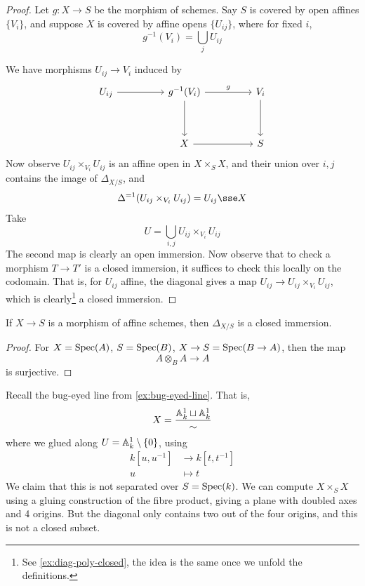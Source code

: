 \documentclass{article}
\begin{document}
\begin{proof}
    Let \(g : X \to S\) be the morphism of schemes. Say \(S\) is covered by open affines \(\{V_i\}\), and suppose \(X\) is covered by affine opens \(\{U_{ij}\}\), where for fixed \(i\),
    \[g^{-1}(V_i) = \bigcup_j U_{ij}\]

    We have morphisms \(U_{ij} \to V_i\) induced by
\[\begin{tikzcd}
	{U_{ij}} && {g^{-1}(V_i)} && {V_i} \\
	\\
	&& X && S
	\arrow["g", from=1-3, to=1-5]
	\arrow[from=1-3, to=3-3]
	\arrow[from=1-5, to=3-5]
	\arrow[from=3-3, to=3-5]
	\arrow[from=1-1, to=1-3]
\end{tikzcd}\]
    Now observe \(U_{ij} \times_{V_i} U_{ij}\) is an affine open in \(X \times_S X\), and their union over \(i, j\) contains the image of \(\Delta_{X/S}\), and
    \[\Delta^{=1}(U_{ij} \times_{V_i} U_{ij}) = U_{ij} \sse X\] 
    Take
    \[U = \bigcup_{i, j}U_{ij} \times_{V_i}U_{ij}\]
    The second map is clearly an open immersion. Now observe that to check a morphism \(T \to T'\) is a closed immersion, it suffices to check this locally on the codomain. That is, for \(U_{ij}\) affine, the diagonal gives a map \(U_{ij} \to U_{ij} \times_{V_i}U_{ij}\), which is clearly\footnote{See \cref{ex:diag-poly-closed}, the idea is the same once we unfold the definitions.} a closed immersion.
\end{proof}

\begin{proposition}
    \label{prop:aff-morphism-separated}
    If \(X \to S\) is a morphism of affine schemes, then \(\Delta_{X/S}\) is a closed immersion.
\end{proposition}

\begin{proof}
    For \(X = \operatorname{Spec}(A)\), \(S = \operatorname{Spec}(B)\), \(X \to S = \operatorname{Spec}(B \to A)\), then the map
    \[A \otimes_B A \to A\]
    is surjective.
\end{proof}

\begin{example}
    Recall the bug-eyed line from \cref{ex:bug-eyed-line}. That is,
    \[X = \frac{\mathbb{A}_{k}^{1} \sqcup \mathbb{A}_{k}^{1}}{\sim}\]
    where we glued along \(U = \mathbb{A}_{k}^{1} \setminus \{0\}\), using
    \begin{align*}
        k[u, u^{-1}] &\to k[t, t^{-1}] \\
        u &\mapsto t
    \end{align*}
    We claim that this is not separated over \(S = \operatorname{Spec}(k)\). We can compute \(X \times_S X\) using a gluing construction of the fibre product, giving a plane with doubled axes and 4 origins. But the diagonal only contains two out of the four origins, and this is not a closed subset.
\end{example}
\end{document}

